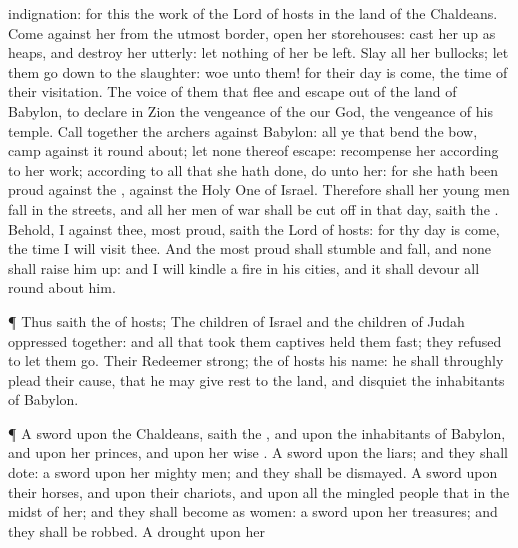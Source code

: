 {indignation: for this
{} the
work of the
Lord
{} of
hosts in the
land of the
Chaldeans.
Come against her from the utmost
border,
open her
storehouses: cast her
up as
heaps, and destroy her
utterly: let nothing of her be
left.
Slay all her
bullocks; let them go
down to the
slaughter:
woe unto them! for their
day is
come, the
time of their
visitation.
The
voice of them that
flee and escape
out of the
land of
Babylon, to
declare in
Zion the
vengeance of the
{} our
God, the
vengeance of his
temple.
Call
together the
archers against
Babylon: all ye that
bend the
bow,
camp against it round
about; let none thereof
escape:
recompense her according to her
work; according to all that she hath
done,
do unto her: for she hath been
proud against the
{}, against the Holy
One of
Israel.
Therefore shall her young
men
fall in the
streets, and all her
men of
war shall be cut
off in that
day,
saith the
{}.
Behold, I
{} against thee,
{} most
proud,
saith the
Lord
{} of
hosts: for thy
day is
come, the
time
{} I will
visit thee.
And the most
proud shall
stumble and
fall, and none shall raise him
up: and I will
kindle a
fire in his
cities, and it shall
devour all round
about him.
\par }{\PP {}¶ Thus
saith the
{} of
hosts; The
children of
Israel and the
children of
Judah
{}
oppressed
together: and all that took them
captives held them
fast; they
refused to let them
go.
Their
Redeemer
{}
strong; the
{} of
hosts
{} his
name: he shall
throughly
plead their
cause, that he may give
rest to the
land, and
disquiet the
inhabitants of
Babylon.
\par }{\PP {}¶ A
sword
{} upon the
Chaldeans,
saith the
{}, and upon the
inhabitants of
Babylon, and upon her
princes, and upon her
wise
{}.
A
sword
{} upon the
liars; and they shall
dote: a
sword
{} upon her mighty
men; and they shall be
dismayed.
A
sword
{} upon their
horses, and upon their
chariots, and upon all the mingled
people that
{} in the
midst of her; and they shall become as
women: a
sword
{} upon her
treasures; and they shall be
robbed.
A
drought
{} upon her
}
